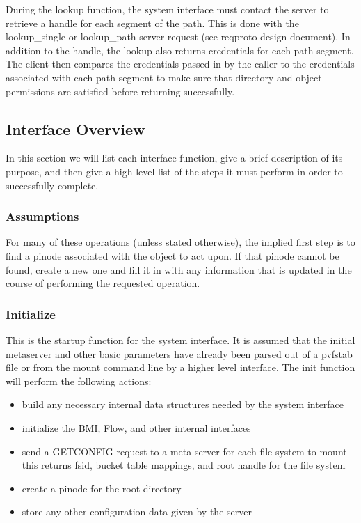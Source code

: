 \documentclass[11pt, letterpaper]{article}
\begin{document}
During the lookup function, the system interface must contact the server
to retrieve a handle for each segment of the path.  This is done with
the lookup\_single or lookup\_path server request (see reqproto design
document).  In addition to the handle, the lookup also returns credentials 
for each path segment.  The client then compares the credentials passed
in by the caller to the credentials associated with each path segment to
make sure that directory and object permissions are satisfied before
returning successfully.

\subsection{Interface Overview}

In this section we will list each interface function, give a brief
description of its purpose, and then give a high level list of the steps
it must perform in order to successfully complete.    

\subsubsection{Assumptions}

For many of these operations (unless stated otherwise), the implied
first step is to find a pinode associated with the object to act upon.
If that pinode cannot be found, create a new one and fill it in with any
information that is updated in the course of performing the requested
operation.

\subsubsection{Initialize}

This is the startup function for the system
interface.  It is assumed that the initial metaserver and other basic
parameters have already been parsed out of a pvfstab file or from the
mount command line by a higher level interface.  The init function 
will perform the following actions:

\begin{itemize}
\item build any necessary internal data structures needed by
the system interface
\item initialize the BMI, Flow, and other internal interfaces
\item send a GETCONFIG request to a meta server for each file system to
mount- this returns fsid, bucket table mappings, and root
handle for the file system 
\item create a pinode for the root directory
\item store any other configuration data given by the server
\end{itemize}
\end{document}
